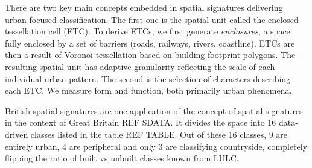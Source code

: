 There are two key main concepts embedded in spatial signatures delivering urban-focused classification. The first one is the spatial unit called the enclosed tessellation cell (ETC). To derive ETCs, we first generate \textit{enclosures}, a space fully enclosed by a set of barriers (roads, railways, rivers, coastline). ETCs are then a result of Voronoi tessellation based on building footprint polygons. The resulting spatial unit has adaptive granularity reflecting the scale of each individual urban pattern. The second is the selection of characters describing each ETC. We measure form and function, both primarily urban phenomena.


British spatial signatures are one application of the concept of spatial signatures in the context of Great Britain REF SDATA. It divides the space into 16 data-driven classes listed in the table REF TABLE. Out of these 16 classes, 9 are entirely urban, 4 are peripheral and only 3 are classifying countryside, completely flipping the ratio of built vs unbuilt classes known from LULC.


